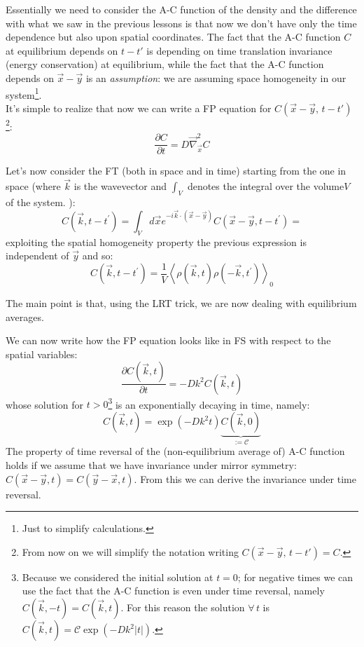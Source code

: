 \documentclass[\main/main.tex]{subfiles}
\begin{document}
Essentially we need to  consider the A-C function of the density and the difference with what we saw in the previous lessons is that now we don't have only the time dependence but also upon spatial coordinates. The fact that the A-C function $C$ at equilibrium depends on $t-t'$ is depending on time translation invariance (energy conservation) at equilibrium, while the fact that the A-C function depends on $\vec{x}-\vec{y}$ is an \textit{assumption}: we are assuming space homogeneity in our system\footnote{Just to simplify calculations.}. \\

It's simple to realize that now we can write a FP equation for $C(\vec{x}-\vec{y},\, t-t')$\footnote{From now on we will simplify the notation writing $C(\vec{x}-\vec{y},\, t-t')=C$.}:
\begin{equation}
    \frac{\partial C}{\partial t}=D \vec{\nabla}_{\vec{x}}^{2} C
\end{equation}

Let's now consider the FT (both in space and in time) starting from the one in space (where $\vec{k}$ is the wavevector and $\int_{V}$  denotes the integral over the volume$ V $ of the system. ):
\begin{equation}
    C\left(\vec{k}, t-t^{\prime}\right)=\int_{V} d \vec{x} e^{-i \vec{k} \cdot(\vec{x}-\vec{y})} C\left(\vec{x}-\vec{y}, t-t^{\prime}\right)=
\end{equation}
exploiting the spatial homogeneity property the previous expression is independent of $\vec{y}$ and so:
\begin{equation}
    C\left(\vec{k}, t-t^{\prime}\right)=\frac{1}{V}\left\langle\rho(\vec{k}, t) \rho\left(-\vec{k}, t^{\prime}\right)\right\rangle_{0}
    \label{eq:33}
\end{equation}

The main point is that, using the LRT trick, we are now dealing with equilibrium averages.

We can now write how the FP equation looks like in FS with respect to the spatial variables:
\begin{equation}
    \frac{\partial C(\vec{k}, t)}{\partial t}=-D k^{2} C(\vec{k}, t)
\end{equation}
whose solution for $t>0$\footnote{Because we considered the initial solution at $t=0$; for negative times we can use the fact that the A-C function is even under time reversal, namely $C(\vec{k}, -t)= C(\vec{k}, t)$. For this reason the solution $\forall \,t$ is $ C(\vec{k}, t)=\mathscr{C}\exp \left(-D k^{2} |t|\right)$.} is an exponentially decaying in time, namely:
\begin{equation}
   C(\vec{k}, t)=\exp \left(-D k^{2} t\right) \underbrace{C(\vec{k}, 0)}_{:=\mathscr{C}}
\end{equation}
The property of time reversal of the (non-equilibrium average of) A-C function holds if we assume that we have invariance under mirror symmetry: $C\left(\vec{x}-\vec{y}, t\right)=C\left(\vec{y}-\vec{x}, t\right)$. From this we can derive the invariance under time reversal. \\
\end{document}
